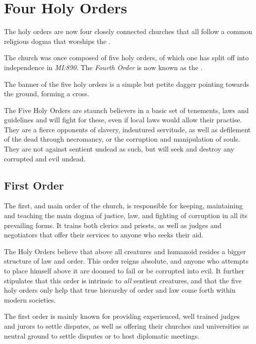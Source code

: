 \section{Four Holy Orders}
\label{sec:Four Holy Orders}

The holy orders are now four closely connected churches that all follow a
common religious dogma that worships the .

The church was once composed of five holy orders, of which one has split off
into independence in \emph{MI:890}. The \emph{Fourth Order} is now known
as the .

The banner of the five holy orders is a simple but petite dagger pointing
towards the ground, forming a cross.

The Five Holy Orders are staunch believers in a basic set of tenements, laws
and guidelines and will fight for these, even if local laws would allow their
practise. They are a fierce opponents of slavery, indentured servitude, as
well as defilement of the dead through necromancy, or the corruption and
manipulation of souls. They are not against sentient undead as such, but will
seek and destroy any corrupted and evil undead.

\subsection{First Order}
\label{sec:First Order}

The first, and main order of the church, is responsible for keeping, maintaining
and teaching the main dogma of justice, law, and fighting of corruption in all
its prevailing forms. It trains both clerics and priests, as well as judges and
negotiators that offer their services to anyone who seeks their aid.

The Holy Orders believe that above all creatures and humanoid resides a bigger
structure of law and order. This order reigns absolute, and anyone who attempts
to place himself above it are doomed to fail or be corrupted into evil. It
further stipulates that this order is intrinsic to \emph{all} sentient
creatures, and that the five holy orders only help that true hierarchy of order
and law come forth within modern societies.

The first order is mainly known for providing experienced, well trained judges
and jurors to settle disputes, as well as offering their churches and
universities as neutral ground to settle disputes or to host diplomatic
meetings.

